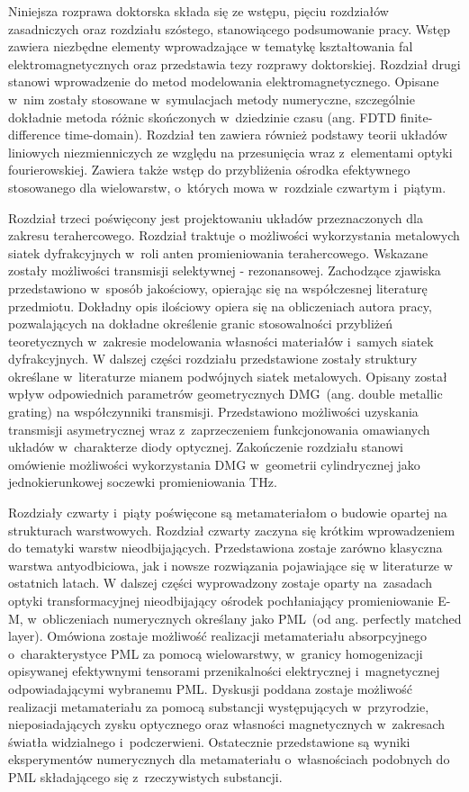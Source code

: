 Niniejsza rozprawa doktorska składa się ze wstępu, pięciu rozdziałów zasadniczych oraz rozdziału szóstego, stanowiącego podsumowanie pracy. Wstęp zawiera niezbędne elementy wprowadzające w tematykę kształtowania fal elektromagnetycznych oraz przedstawia tezy rozprawy doktorskiej. Rozdział drugi stanowi wprowadzenie do metod modelowania elektromagnetycznego. Opisane w~nim zostały stosowane w~symulacjach metody numeryczne, szczególnie dokładnie metoda różnic skończonych w~dziedzinie czasu (ang. FDTD finite-difference time-domain). Rozdział ten zawiera również podstawy teorii układów liniowych niezmienniczych ze względu na przesunięcia wraz z~elementami optyki fourierowskiej. Zawiera także wstęp do przybliżenia ośrodka efektywnego stosowanego dla wielowarstw, o~których mowa w~rozdziale czwartym i~piątym.

Rozdział trzeci poświęcony jest projektowaniu układów przeznaczonych dla zakresu terahercowego. Rozdział traktuje o możliwości wykorzystania metalowych siatek dyfrakcyjnych w~roli anten promieniowania terahercowego. Wskazane zostały możliwości transmisji  selektywnej - rezonansowej. Zachodzące zjawiska przedstawiono w~sposób jakościowy, opierając się na współczesnej literaturę przedmiotu. Dokładny opis ilościowy opiera się na obliczeniach autora pracy, pozwalających na dokładne określenie granic stosowalności przybliżeń teoretycznych w~zakresie modelowania własności materiałów i~samych siatek dyfrakcyjnych. W dalszej części rozdziału przedstawione zostały struktury określane w~literaturze mianem podwójnych siatek metalowych. Opisany został wpływ odpowiednich parametrów geometrycznych DMG~(ang. double metallic grating) na współczynniki transmisji. Przedstawiono możliwości uzyskania transmisji asymetrycznej wraz z~zaprzeczeniem funkcjonowania omawianych układów w~charakterze diody optycznej. Zakończenie rozdziału stanowi omówienie możliwości wykorzystania DMG w~geometrii cylindrycznej jako jednokierunkowej soczewki promieniowania THz.

Rozdziały czwarty i~piąty poświęcone są metamateriałom o budowie opartej na strukturach warstwowych. Rozdział czwarty zaczyna się krótkim wprowadzeniem do tematyki warstw nieodbijających. Przedstawiona zostaje zarówno klasyczna warstwa antyodbiciowa, jak i nowsze rozwiązania pojawiające się w literaturze w ostatnich latach. W dalszej części wyprowadzony zostaje oparty na~zasadach optyki transformacyjnej nieodbijający ośrodek pochłaniający promieniowanie E-M, w~obliczeniach numerycznych określany jako PML~(od ang. perfectly matched layer). Omówiona zostaje możliwość realizacji metamateriału absorpcyjnego o~charakterystyce PML za pomocą wielowarstwy, w~granicy homogenizacji opisywanej efektywnymi tensorami przenikalności elektrycznej i~magnetycznej odpowiadającymi wybranemu PML. Dyskusji poddana zostaje możliwość realizacji metamateriału za pomocą substancji występujących w~przyrodzie, nieposiadających zysku optycznego oraz własności magnetycznych w~zakresach światła widzialnego i~podczerwieni. Ostatecznie przedstawione są wyniki eksperymentów numerycznych dla metamateriału o~własnościach podobnych do PML składającego się z~rzeczywistych substancji.

